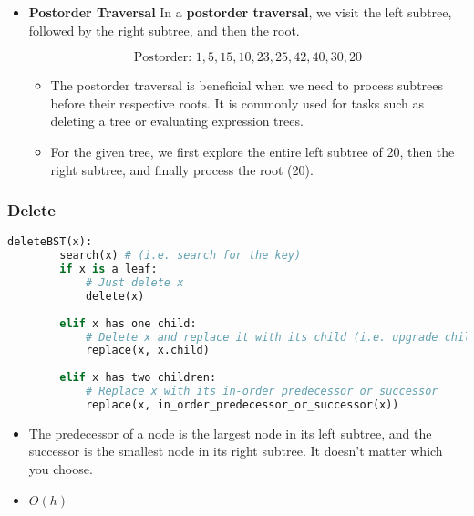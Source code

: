 \begin{example}
\begin{itemize}
        \item \textbf{Postorder Traversal}
        In a \textbf{postorder traversal}, we visit the left subtree, followed by the right subtree, and then the root.
        
        \[
        \text{Postorder: } 1, 5, 15, 10, 23, 25, 42, 40, 30, 20
        \]
        \begin{itemize}
            \item The postorder traversal is beneficial when we need to process subtrees before their respective roots. It is commonly used for tasks such as deleting a tree or evaluating expression trees.
            \item For the given tree, we first explore the entire left subtree of 20, then the right subtree, and finally process the root (20). 
        \end{itemize}
    \end{itemize}

\end{example}

\subsubsection{Delete}
\begin{definition}
    \begin{lstlisting}[language=Python, caption={Delete Operation in BST}]
    deleteBST(x):
        search(x) # (i.e. search for the key)
        if x is a leaf:
            # Just delete x
            delete(x)
        
        elif x has one child:
            # Delete x and replace it with its child (i.e. upgrade child)
            replace(x, x.child)
        
        elif x has two children:
            # Replace x with its in-order predecessor or successor
            replace(x, in_order_predecessor_or_successor(x))
    \end{lstlisting}
    \begin{itemize}
        \item The predecessor of a node is the largest node in its left subtree, and the successor is the smallest node in its right subtree. It doesn't matter which you choose.
        \item $O(h)$
    \end{itemize}

\end{definition}

